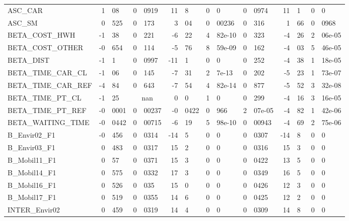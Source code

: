 \documentclass[12pt,a4paper]{article}
\begin{document}
\begin{sidewaystable}[htb]
\begin{tabular}{lr@{.}lr@{.}lr@{.}lr@{.}lr@{.}lr@{.}lr@{.}l}
ASC\_CAR                    &    1&08 &   0&0919 &    11&8 &      0&0 &        0&0974 &         11&1 &           0&0 \\
ASC\_SM                     &   0&525 &    0&173 &    3&04 &  0&00236 &         0&316 &         1&66 &        0&0968 \\
BETA\_COST\_HWH              &   -1&38 &    0&221 &   -6&22 & 4&82e-10 &         0&323 &        -4&26 &      2&06e-05 \\
BETA\_COST\_OTHER            &  -0&654 &    0&114 &   -5&76 & 8&59e-09 &         0&162 &        -4&03 &      5&46e-05 \\
BETA\_DIST                  &    -1&1 &   0&0997 &   -11&1 &      0&0 &         0&252 &        -4&38 &      1&18e-05 \\
BETA\_TIME\_CAR\_CL           &   -1&06 &    0&145 &   -7&31 &  2&7e-13 &         0&202 &        -5&23 &      1&73e-07 \\
BETA\_TIME\_CAR\_REF          &   -4&84 &    0&643 &   -7&54 & 4&82e-14 &         0&877 &        -5&52 &      3&32e-08 \\
BETA\_TIME\_PT\_CL            &   -1&25 &    \multicolumn{2}{c}{nan} &     0&0 &      1&0 &         0&299 &        -4&16 &      3&16e-05 \\
BETA\_TIME\_PT\_REF           & -0&0001 &  0&00237 & -0&0422 &    0&966 &      2&07e-05 &        -4&82 &      1&42e-06 \\
BETA\_WAITING\_TIME          & -0&0442 &  0&00715 &   -6&19 & 5&98e-10 &       0&00943 &        -4&69 &      2&75e-06 \\
B\_Envir02\_F1               &  -0&456 &   0&0314 &   -14&5 &      0&0 &        0&0307 &        -14&8 &           0&0 \\
B\_Envir03\_F1               &   0&483 &   0&0317 &    15&2 &      0&0 &        0&0316 &         15&3 &           0&0 \\
B\_Mobil11\_F1               &    0&57 &   0&0371 &    15&3 &      0&0 &        0&0422 &         13&5 &           0&0 \\
B\_Mobil14\_F1               &   0&575 &   0&0332 &    17&3 &      0&0 &        0&0349 &         16&5 &           0&0 \\
B\_Mobil16\_F1               &   0&526 &    0&035 &    15&0 &      0&0 &        0&0426 &         12&3 &           0&0 \\
B\_Mobil17\_F1               &   0&519 &   0&0355 &    14&6 &      0&0 &        0&0425 &         12&2 &           0&0 \\
INTER\_Envir02              &   0&459 &   0&0319 &    14&4 &      0&0 &        0&0309 &         14&8 &           0&0 \\

\end{tabular}
\end{sidewaystable}
\end{document}
